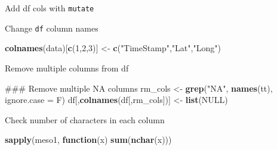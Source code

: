 \documentclass[10,portrait]{article}
\newenvironment{Shaded}{\begin{snugshade}}{\end{snugshade}}
\newcommand{\KeywordTok}[1]{\textcolor[rgb]{0.13,0.29,0.53}{\textbf{#1}}}
\newcommand{\DataTypeTok}[1]{\textcolor[rgb]{0.13,0.29,0.53}{#1}}
\newcommand{\DecValTok}[1]{\textcolor[rgb]{0.00,0.00,0.81}{#1}}
\newcommand{\StringTok}[1]{\textcolor[rgb]{0.31,0.60,0.02}{#1}}
\newcommand{\OtherTok}[1]{\textcolor[rgb]{0.56,0.35,0.01}{#1}}
\newcommand{\ControlFlowTok}[1]{\textcolor[rgb]{0.13,0.29,0.53}{\textbf{#1}}}
\newcommand{\OperatorTok}[1]{\textcolor[rgb]{0.81,0.36,0.00}{\textbf{#1}}}
\newcommand{\NormalTok}[1]{#1}
\begin{document}
Add df cols with \texttt{mutate}

\begin{Shaded}
\end{Shaded}

Change \texttt{df} column names

\begin{Shaded}
\begin{Highlighting}[]
\KeywordTok{colnames}\NormalTok{(data)[}\KeywordTok{c}\NormalTok{(}\DecValTok{1}\NormalTok{,}\DecValTok{2}\NormalTok{,}\DecValTok{3}\NormalTok{)] <-}\StringTok{ }\KeywordTok{c}\NormalTok{(}\StringTok{"TimeStamp"}\NormalTok{,}\StringTok{"Lat"}\NormalTok{,}\StringTok{"Long"}\NormalTok{)}
\end{Highlighting}
\end{Shaded}

Remove multiple columns from df

\begin{Shaded}
\begin{Highlighting}[]
\NormalTok{### Remove multiple NA columns  }
\NormalTok{rm_cols <-}\StringTok{ }\KeywordTok{grep}\NormalTok{(}\StringTok{"NA"}\NormalTok{, }\KeywordTok{names}\NormalTok{(tt), }\DataTypeTok{ignore.case =}\NormalTok{ F)}
\NormalTok{df[,}\KeywordTok{colnames}\NormalTok{(df[,rm_cols])] <-}\StringTok{ }\KeywordTok{list}\NormalTok{(}\OtherTok{NULL}\NormalTok{)}
\end{Highlighting}
\end{Shaded}

Check number of characters in each column

\begin{Shaded}
\begin{Highlighting}[]
\KeywordTok{sapply}\NormalTok{(meso1, }\ControlFlowTok{function}\NormalTok{(x) }\KeywordTok{sum}\NormalTok{(}\KeywordTok{nchar}\NormalTok{(x)))   }
\end{Highlighting}
\end{Shaded}
\end{document}
